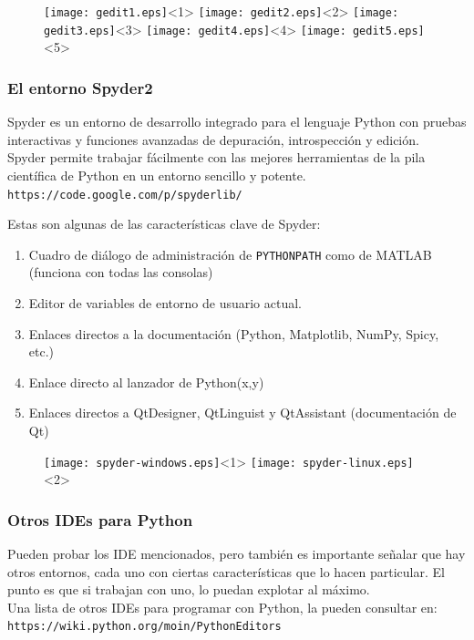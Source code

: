 \begin{frame}[fragile]
\begin{figure}
	\centering
	\texttt{[image: gedit1.eps]}<1> 
	\texttt{[image: gedit2.eps]}<2>
	\texttt{[image: gedit3.eps]}<3>
	\texttt{[image: gedit4.eps]}<4>
	\texttt{[image: gedit5.eps]}<5>
\end{figure}
\end{frame}
\begin{frame}
\frametitle{El entorno Spyder2}
Spyder es un entorno de desarrollo integrado para el lenguaje Python con pruebas interactivas y funciones avanzadas de depuración, introspección y edición.
\\
\medskip
Spyder permite trabajar fácilmente con las mejores herramientas de la pila científica de Python en un entorno sencillo y potente.
\\
\medskip
\texttt{https://code.google.com/p/spyderlib/}
\end{frame}
\begin{frame}[fragile]
Estas son algunas de las características clave de Spyder:
\begin{enumerate}[<+->]
\item Cuadro de diálogo de administración de \texttt{PYTHONPATH} como de MATLAB (funciona con todas las consolas)
\item Editor de variables de entorno de usuario actual.
\item Enlaces directos a la documentación (Python, Matplotlib, NumPy, Spicy, etc.)
\item Enlace directo al lanzador de Python(x,y)
\item Enlaces directos a QtDesigner, QtLinguist y QtAssistant (documentación de Qt)
\end{enumerate}
\end{frame}
\begin{frame}
\begin{figure}
	\centering
	\texttt{[image: spyder-windows.eps]}<1>
	\texttt{[image: spyder-linux.eps]}<2> 
\end{figure}
\end{frame}
\begin{frame}
\frametitle{Otros IDEs para Python}
Pueden probar los IDE mencionados, pero también es importante señalar que hay otros entornos, cada uno con ciertas características que lo hacen particular. El punto es que si trabajan con uno, lo puedan explotar al máximo.
\\
\medskip
Una lista de otros IDEs para programar con Python, la pueden consultar en:
\\
\medskip
\texttt{https://wiki.python.org/moin/PythonEditors}
\end{frame}
